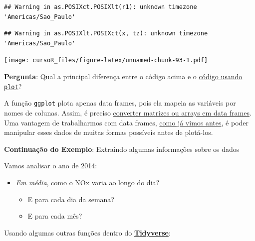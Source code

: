 \documentclass[]{book}
\providecommand{\tightlist}{%
  \setlength{\itemsep}{0pt}\setlength{\parskip}{0pt}}
\theoremstyle{definition}
\theoremstyle{definition}
\theoremstyle{definition}
\theoremstyle{remark}
\begin{document}
\begin{verbatim}
## Warning in as.POSIXct.POSIXlt(r1): unknown timezone 'Americas/Sao_Paulo'
\end{verbatim}

\begin{verbatim}
## Warning in as.POSIXlt.POSIXct(x, tz): unknown timezone 'Americas/Sao_Paulo'
\end{verbatim}

\texttt{[image: cursoR\_files/figure-latex/unnamed-chunk-93-1.pdf]}

{\textbf{Pergunta}: Qual a principal diferença entre o código acima e o
\protect\hyperlink{plot_base}{código usando \texttt{plot}}?}

A função \texttt{ggplot} plota apenas data frames, pois ela mapeia as
variáveis por nomes de colunas. Assim, é preciso
\protect\hyperlink{convert_df}{converter matrizes ou arrays em data
frames}.\\
Uma vantagem de trabalharmos com data frames,
\protect\hyperlink{processing_dfs}{como já vimos antes}, é poder
manipular esses dados de muitas formas possíveis antes de plotá-los.

\textbf{Continuação do Exemplo}: Extraindo algumas informações sobre os
dados

Vamos analisar o ano de 2014:

\begin{itemize}
\tightlist
\item
  \emph{Em média}, como o NOx varia ao longo do dia?

  \begin{itemize}
  \tightlist
  \item
    E para cada dia da semana?\\
  \item
    E para cada mês?
  \end{itemize}
\end{itemize}

Usando algumas outras funções dentro do
\protect\hyperlink{tidyverse}{\textbf{Tidyverse}}:
\end{document}
